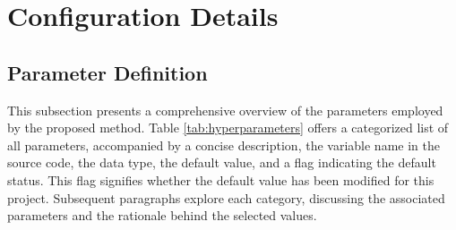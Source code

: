\chapter{Configuration Details}
\label{chap:configuration_details}

\section{Parameter Definition}
\label{sec:parameter_definition}
This subsection presents a comprehensive overview of the parameters employed by the proposed method. Table \ref{tab:hyperparameters} offers a categorized list of all parameters, accompanied by a concise description, the variable name in the source code, the data type, the default value, and a flag indicating the default status. This flag signifies whether the default value has been modified for this project. Subsequent paragraphs explore each category, discussing the associated parameters and the rationale behind the selected values.


